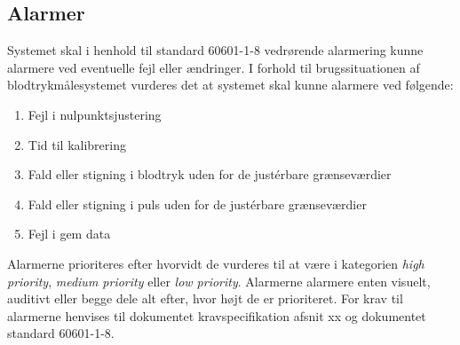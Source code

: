 \subsection{Alarmer}
Systemet skal i henhold til standard 60601-1-8 vedrørende alarmering kunne alarmere ved eventuelle fejl eller ændringer. I forhold til brugssituationen af blodtrykmålesystemet vurderes det at systemet skal kunne alarmere ved følgende:

\begin{enumerate}[1.]
	\item Fejl i nulpunktsjustering
	\item Tid til kalibrering
	\item Fald eller stigning i blodtryk uden for de justérbare grænseværdier
	\item Fald eller stigning i puls uden for de justérbare grænseværdier
	\item Fejl i gem data 
\end{enumerate}

Alarmerne prioriteres efter hvorvidt de vurderes til at være i kategorien \textit{high priority}, \textit{medium priority} eller \textit{low priority}. Alarmerne alarmere enten visuelt, auditivt eller begge dele alt efter, hvor højt de er prioriteret. For krav til alarmerne henvises til dokumentet kravspecifikation afsnit xx og dokumentet standard 60601-1-8. 

\clearpage 